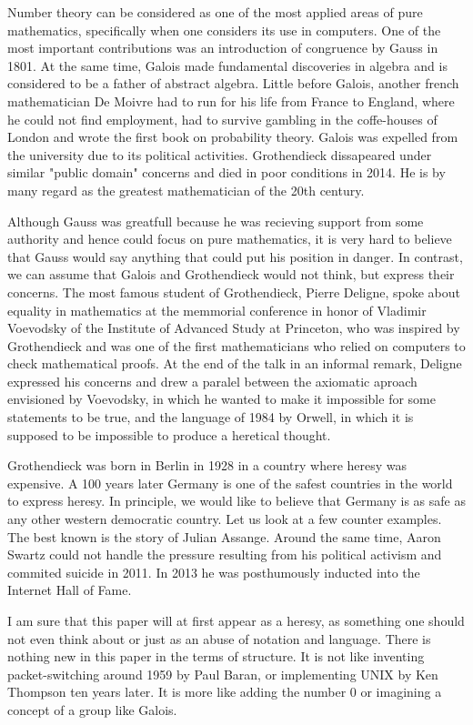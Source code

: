 \documentclass{article}
\begin{document}
Number theory can be considered as one of the most applied areas of pure
mathematics, specifically when one considers its use in computers. One of the most
important contributions was an introduction of congruence by Gauss in 1801. At the
same time, Galois made fundamental discoveries in algebra and is considered to be
a father of abstract algebra. Little before Galois, another french
mathematician De Moivre had to run for his life from France to England, where he
could not find employment, had to survive gambling in the coffe-houses of London
and wrote the first book on probability theory. Galois was expelled from the
university due to its political activities. Grothendieck dissapeared under similar
"public domain" concerns and died in poor conditions in 2014. He is by many
regard as the greatest mathematician of the 20th century. 

Although Gauss was greatfull because he was recieving support from some
authority and hence could focus on pure mathematics, it is very hard to believe
that Gauss would say anything that could put his position in danger. In contrast,
we can assume that Galois and Grothendieck would not think, but express their
concerns. The most famous student of Grothendieck, Pierre Deligne, spoke about
equality in mathematics at the memmorial conference in honor of Vladimir Voevodsky
of the Institute of Advanced Study at Princeton, who was inspired by Grothendieck
and was one of the first mathematicians who relied on computers to check
mathematical proofs. At the end of the talk in an informal remark, Deligne expressed
his concerns and drew a paralel between the axiomatic aproach envisioned by
Voevodsky, in which he wanted to make it impossible for some statements to be true,
and the language of 1984 by Orwell, in which it is supposed to be impossible to
produce a heretical thought. 

Grothendieck was born in Berlin in 1928 in a country where heresy was expensive.
A 100 years later Germany is one of the safest countries in the world to express
heresy. In principle, we would like to believe that Germany is as safe as any
other western democratic country. Let us look at a few counter examples. The best
known is the story of Julian Assange. Around the same time, Aaron Swartz could not
handle the pressure resulting from his political activism and commited suicide in
2011. In 2013 he was posthumously inducted into the Internet Hall of Fame.

I am sure that this paper will at first appear as a heresy, as something one should
not even think about or just as an abuse of notation and language. There is nothing
new in this paper in the terms of structure. It is not like inventing packet-switching
around 1959 by Paul Baran, or implementing UNIX by Ken Thompson ten years later.
It is more like adding the number 0 or imagining a concept of a group like Galois.
\end{document}
